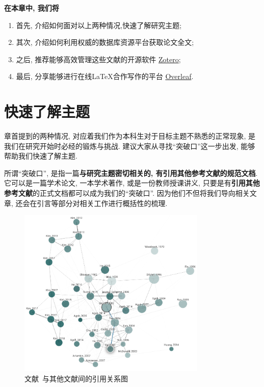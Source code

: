 \documentclass{formatBook}
\begin{document}
\textbf{在本章中, 我们将}
\begin{enumerate}
    \item 首先, 介绍如何面对以上两种情况,快速了解研究主题;
    \item 其次, 介绍如何利用权威的数据库资源平台获取论文全文;
    \item 之后, 推荐能够高效管理这些文献的开源软件 \href{https://www.zotero.org/}{Zotero};
    \item 最后, 分享能够进行在线\LaTeX 合作写作的平台 \href{https://www.overleaf.com/}{Overleaf}.
\end{enumerate}

\section{快速了解主题}
章首提到的两种情况, 对应着我们作为本科生对于目标主题不熟悉的正常现象, 是我们在研究开始时必经的锻炼与挑战. 建议大家从寻找``突破口''这一步出发, 能够帮助我们快速了解主题.

所谓``突破口'', 是指一篇\textbf{与研究主题密切相关的, 有引用其他参考文献的规范文档}. 它可以是一篇学术论文, 一本学术著作, 或是一份教师授课讲义, 只要是有\textbf{引用其他参考文献}的正式文档都可以成为我们的``突破口''. 因为他们不但将我们导向相关文章, 还会在引言等部分对相关工作进行概括性的梳理.

\begin{figure}[H]
    \centering
    \includegraphics[width=0.8\textwidth]{figure/graph.png}
    \caption{文献~\cite{gessel_mikis_2005}与其他文献间的引用关系图}
    \label{fig:mikiGrapg}
\end{figure}
\end{document}
